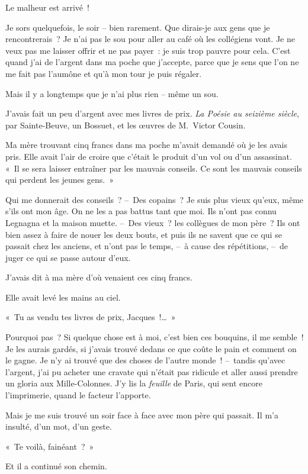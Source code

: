 \documentclass[french,twoside]{book} %
\begin{document}
\noindent Le malheur est arrivé !\par
Je sors quelquefois, le soir – bien rarement. Que dirais-je aux gens que je rencontrerais ? Je n’ai pas le sou pour aller au café où les collégiens vont. Je ne veux pas me laisser offrir et ne pas payer : je suis trop pauvre pour cela. C’est quand j’ai de l’argent dans ma poche que j’accepte, parce que je sens que l’on ne me fait pas l’aumône et qu’à mon tour je puis régaler.\par
Mais il y a longtemps que je n’ai plus rien – même un sou.\par
J’avais fait un peu d’argent avec mes livres de prix. \emph{La Poésie au seizième siècle}, par Sainte-Beuve, un Bossuet, et les œuvres de M. Victor Cousin.\par
Ma mère trouvant cinq francs dans ma poche m’avait demandé où je les avais pris. Elle avait l’air de croire que c’était le produit d’un vol ou d’un assassinat. « Il se sera laisser entraîner par les mauvais conseils. Ce sont les mauvais conseils qui perdent les jeunes gens. »\par
Qui me donnerait des conseils ? – Des copains ? Je suis plus vieux qu’eux, même s’ils ont mon âge. On ne les a pas battus tant que moi. Ils n’ont pas connu Legnagna et la maison muette. – Des vieux ? les collègues de mon père ? Ils ont bien assez à faire de nouer les deux bouts, et puis ils ne savent que ce qui se passait chez les anciens, et n’ont pas le temps, – à cause des répétitions, – de juger ce qui se passe autour d’eux.\par
J’avais dit à ma mère d’où venaient ces cinq francs.\par
Elle avait levé les mains au ciel.\par
« Tu as vendu tes livres de prix, Jacques !… »\par
Pourquoi pas ? Si quelque chose est à moi, c’est bien ces bouquins, il me semble ! Je les aurais gardés, si j’avais trouvé dedans ce que coûte le pain et comment on le gagne. Je n’y ai trouvé que des choses de l’autre monde ! – tandis qu’avec l’argent, j’ai pu acheter une cravate qui n’était pas ridicule et aller aussi prendre un gloria aux Mille-Colonnes. J’y lis la \emph{feuille} de Paris, qui sent encore l’imprimerie, quand le facteur l’apporte.\par
Mais je me suis trouvé un soir face à face avec mon père qui passait. Il m’a insulté, d’un mot, d’un geste.\par
« Te voilà, fainéant ? »\par
Et il a continué son chemin.\par
\end{document}
